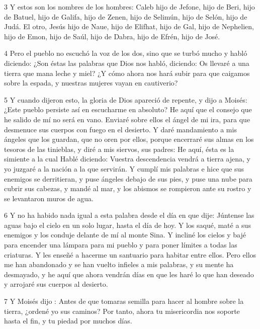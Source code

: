 \par 3 Y estos son los nombres de los hombres: Caleb hijo de Jefone, hijo de Beri, hijo de Batuel, hijo de Galifa, hijo de Zenen, hijo de Selimún, hijo de Selón, hijo de Judá. El otro, Jesús hijo de Naue, hijo de Elifhat, hijo de Gal, hijo de Nephelien, hijo de Emon, hijo de Saúl, hijo de Dabra, hijo de Efrén, hijo de José.

\par 4 Pero el pueblo no escuchó la voz de los dos, sino que se turbó mucho y habló diciendo: ¿Son éstas las palabras que Dios nos habló, diciendo: Os llevaré a una tierra que mana leche y miel? ¿Y cómo ahora nos hará subir para que caigamos sobre la espada, y nuestras mujeres vayan en cautiverio?

\par 5 Y cuando dijeron esto, la gloria de Dios apareció de repente, y dijo a Moisés: ¿Este pueblo persiste así en escucharme en absoluto? He aquí que el consejo que he salido de mí no será en vano. Enviaré sobre ellos el ángel de mi ira, para que desmenuce sus cuerpos con fuego en el desierto. Y daré mandamiento a mis ángeles que los guardan, que no oren por ellos, porque encerraré sus almas en los tesoros de las tinieblas, y diré a mis siervos, sus padres: He aquí, ésta es la simiente a la cual Hablé diciendo: Vuestra descendencia vendrá a tierra ajena, y yo juzgaré a la nación a la que servirán. Y cumplí mis palabras e hice que sus enemigos se derritieran, y puse ángeles debajo de sus pies, y puse una nube para cubrir sus cabezas, y mandé al mar, y los abismos se rompieron ante su rostro y se levantaron muros de agua.

\par 6 Y no ha habido nada igual a esta palabra desde el día en que dije: Júntense las aguas bajo el cielo en un solo lugar, hasta el día de hoy. Y los saqué, maté a sus enemigos y los conduje delante de mí al monte Sina. Y incliné los cielos y bajé para encender una lámpara para mi pueblo y para poner límites a todas las criaturas. Y les enseñé a hacerme un santuario para habitar entre ellos. Pero ellos me han abandonado y se han vuelto infieles a mis palabras, y su mente ha desmayado, y he aquí que ahora vendrán días en que les haré lo que han deseado y arrojaré sus cuerpos al desierto.

\par 7 Y Moisés dijo : Antes de que tomaras semilla para hacer al hombre sobre la tierra, ¿ordené yo sus caminos? Por tanto, ahora tu misericordia nos soporte hasta el fin, y tu piedad por muchos días.

